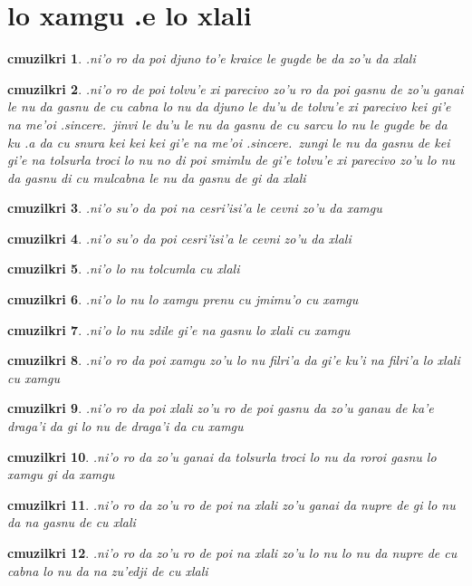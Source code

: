 \documentclass{report}
\newtheorem{cmuzilkri}{cmuzilkri}
\begin{document}
\section{lo xamgu .e lo xlali}
\begin{cmuzilkri}
	.ni'o ro da poi djuno to'e kraice le gugde be da zo'u da xlali
\end{cmuzilkri}
\begin{cmuzilkri}
	.ni'o ro de poi tolvu'e xi parecivo zo'u ro da poi gasnu de zo'u ganai le nu da gasnu de cu cabna lo nu da djuno le du'u de tolvu'e xi parecivo kei gi'e na me'oi .sincere.\ jinvi le du'u le nu da gasnu de cu sarcu lo nu le gugde be da ku .a da cu snura kei kei kei gi'e na me'oi .sincere.\ zungi le nu da gasnu de kei gi'e na tolsurla troci lo nu no di poi smimlu de gi'e tolvu'e xi parecivo zo'u lo nu da gasnu di cu mulcabna le nu da gasnu de gi da xlali
\end{cmuzilkri}
\begin{cmuzilkri}
	.ni'o su'o da poi na cesri'isi'a le cevni zo'u da xamgu
\end{cmuzilkri}
\begin{cmuzilkri}
	.ni'o su'o da poi cesri'isi'a le cevni zo'u da xlali
\end{cmuzilkri}
\begin{cmuzilkri}
	.ni'o lo nu tolcumla cu xlali
\end{cmuzilkri}
\begin{cmuzilkri}
	.ni'o lo nu lo xamgu prenu cu jmimu'o cu xamgu
\end{cmuzilkri}
\begin{cmuzilkri}
	.ni'o lo nu zdile gi'e na gasnu lo xlali cu xamgu
\end{cmuzilkri}
\begin{cmuzilkri}
	.ni'o ro da poi xamgu zo'u lo nu filri'a da gi'e ku'i na filri'a lo xlali cu xamgu
\end{cmuzilkri}
\begin{cmuzilkri}
	.ni'o ro da poi xlali zo'u ro de poi gasnu da zo'u ganau de ka'e draga'i da gi lo nu de draga'i da cu xamgu
\end{cmuzilkri}
\begin{cmuzilkri}
	.ni'o ro da zo'u ganai da tolsurla troci lo nu da roroi gasnu lo xamgu gi da xamgu
\end{cmuzilkri}
\begin{cmuzilkri}
	.ni'o ro da zo'u ro de poi na xlali zo'u ganai da nupre de gi lo nu da na gasnu de cu xlali
\end{cmuzilkri}
\begin{cmuzilkri}
	.ni'o ro da zo'u ro de poi na xlali zo'u lo nu lo nu da nupre de cu cabna lo nu da na zu'edji de cu xlali
\end{cmuzilkri}
\end{document}
